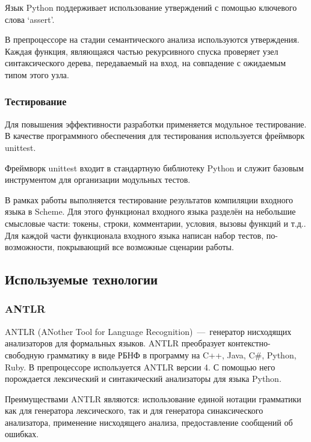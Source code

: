 \documentclass[12pt,a4paper,oneside]{extarticle}
\begin{document}
            Язык Python поддерживает использование утверждений с помощью ключевого слова `assert'. 

            В препроцессоре на стадии семантического анализа используются утверждения. Каждая функция, являющаяся частью рекурсивного спуска проверяет узел синтаксического дерева, передаваемый на вход, на совпадение с ожидаемым типом этого узла.

        \subsubsection{Тестирование}
            Для повышения эффективности разработки применяется модульное тестирование.
            В качестве программного обеспечения для тестирования используется фреймворк unittest.

            Фреймворк unittest входит в стандартную библиотеку Python и служит базовым инструментом для организации модульных тестов.

            В рамках работы выполняется тестирование результатов компиляции входного языка в Scheme.
            Для этого функционал входного языка разделён на небольшие смысловые части: токены, строки, комментарии, условия, вызовы функций и т.д..
            Для каждой части функционала входного языка написан набор тестов, по-возможности, покрывающий все возможные сценарии работы.
    \clearpage

    \subsection{Используемые технологии}
        \subsubsection{ANTLR}
            \label{subsec:antlr}
            ANTLR (ANother Tool for Language Recognition)~---~генератор нисходящих анализаторов для формальных языков.
            ANTLR преобразует контекстно-свободную грамматику в виде РБНФ в программу на C++, Java, C\#, Python, Ruby.
            В препроцессоре используется ANTLR версии 4.
            С помощью него порождается лексический и синтакический анализаторы для языка Python.

            Преимуществами ANTLR являются: использование единой нотации грамматики как для генератора лексического, так и для генератора синаксического анализатора, применение нисходящего анализа, предоставление сообщений об ошибках.
\end{document}
